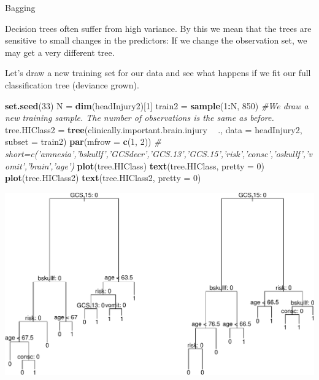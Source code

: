 \documentclass[ignorenonframetext,]{beamer}
\newenvironment{Shaded}{\begin{snugshade}}{\end{snugshade}}
\newcommand{\KeywordTok}[1]{\textcolor[rgb]{0.13,0.29,0.53}{\textbf{#1}}}
\newcommand{\DataTypeTok}[1]{\textcolor[rgb]{0.13,0.29,0.53}{#1}}
\newcommand{\DecValTok}[1]{\textcolor[rgb]{0.00,0.00,0.81}{#1}}
\newcommand{\StringTok}[1]{\textcolor[rgb]{0.31,0.60,0.02}{#1}}
\newcommand{\CommentTok}[1]{\textcolor[rgb]{0.56,0.35,0.01}{\textit{#1}}}
\newcommand{\OperatorTok}[1]{\textcolor[rgb]{0.81,0.36,0.00}{\textbf{#1}}}
\newcommand{\NormalTok}[1]{#1}
\begin{document}
\begin{frame}{Bagging}

Decision trees often suffer from high variance. By this we mean that the
trees are sensitive to small changes in the predictors: If we change the
observation set, we may get a very different tree.

Let's draw a new training set for our data and see what happens if we
fit our full classification tree (deviance grown).

\end{frame}

\begin{frame}[fragile]

\begin{Shaded}
\begin{Highlighting}[]
\KeywordTok{set.seed}\NormalTok{(}\DecValTok{33}\NormalTok{)}
\NormalTok{N =}\StringTok{ }\KeywordTok{dim}\NormalTok{(headInjury2)[}\DecValTok{1}\NormalTok{]}
\NormalTok{train2 =}\StringTok{ }\KeywordTok{sample}\NormalTok{(}\DecValTok{1}\OperatorTok{:}\NormalTok{N, }\DecValTok{850}\NormalTok{)  }\CommentTok{#We draw a new training sample. The number of observations is the same as before.}
\NormalTok{tree.HIClass2 =}\StringTok{ }\KeywordTok{tree}\NormalTok{(clinically.important.brain.injury }\OperatorTok{~}\StringTok{ }\NormalTok{., }\DataTypeTok{data =}\NormalTok{ headInjury2, }
    \DataTypeTok{subset =}\NormalTok{ train2)}
\KeywordTok{par}\NormalTok{(}\DataTypeTok{mfrow =} \KeywordTok{c}\NormalTok{(}\DecValTok{1}\NormalTok{, }\DecValTok{2}\NormalTok{))}
\CommentTok{# short=c('amnesia','bskullf','GCSdecr','GCS.13','GCS.15','risk','consc','oskullf','vomit','brain','age')}
\KeywordTok{plot}\NormalTok{(tree.HIClass)}
\KeywordTok{text}\NormalTok{(tree.HIClass, }\DataTypeTok{pretty =} \DecValTok{0}\NormalTok{)}
\KeywordTok{plot}\NormalTok{(tree.HIClass2)}
\KeywordTok{text}\NormalTok{(tree.HIClass2, }\DataTypeTok{pretty =} \DecValTok{0}\NormalTok{)}
\end{Highlighting}
\end{Shaded}

\includegraphics{8TreesBEAMER_files/figure-beamer/unnamed-chunk-25-1.pdf}

\end{frame}
\end{document}
